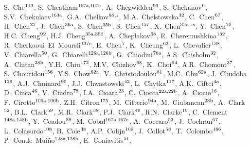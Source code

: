 \begin{flushleft}
S.~Che$^\textrm{\scriptsize 113}$,
S.~Cheatham$^\textrm{\scriptsize 167a,167c}$,
A.~Chegwidden$^\textrm{\scriptsize 93}$,
S.~Chekanov$^\textrm{\scriptsize 6}$,
S.V.~Chekulaev$^\textrm{\scriptsize 163a}$,
G.A.~Chelkov$^\textrm{\scriptsize 68}$$^{,l}$,
M.A.~Chelstowska$^\textrm{\scriptsize 32}$,
C.~Chen$^\textrm{\scriptsize 67}$,
H.~Chen$^\textrm{\scriptsize 27}$,
J.~Chen$^\textrm{\scriptsize 36a}$,
S.~Chen$^\textrm{\scriptsize 35b}$,
S.~Chen$^\textrm{\scriptsize 157}$,
X.~Chen$^\textrm{\scriptsize 35c}$$^{,m}$,
Y.~Chen$^\textrm{\scriptsize 70}$,
H.C.~Cheng$^\textrm{\scriptsize 92}$,
H.J.~Cheng$^\textrm{\scriptsize 35a,35d}$,
A.~Cheplakov$^\textrm{\scriptsize 68}$,
E.~Cheremushkina$^\textrm{\scriptsize 132}$,
R.~Cherkaoui~El~Moursli$^\textrm{\scriptsize 137e}$,
E.~Cheu$^\textrm{\scriptsize 7}$,
K.~Cheung$^\textrm{\scriptsize 63}$,
L.~Chevalier$^\textrm{\scriptsize 138}$,
V.~Chiarella$^\textrm{\scriptsize 50}$,
G.~Chiarelli$^\textrm{\scriptsize 126a,126b}$,
G.~Chiodini$^\textrm{\scriptsize 76a}$,
A.S.~Chisholm$^\textrm{\scriptsize 32}$,
A.~Chitan$^\textrm{\scriptsize 28b}$,
Y.H.~Chiu$^\textrm{\scriptsize 172}$,
M.V.~Chizhov$^\textrm{\scriptsize 68}$,
K.~Choi$^\textrm{\scriptsize 64}$,
A.R.~Chomont$^\textrm{\scriptsize 37}$,
S.~Chouridou$^\textrm{\scriptsize 156}$,
Y.S.~Chow$^\textrm{\scriptsize 62a}$,
V.~Christodoulou$^\textrm{\scriptsize 81}$,
M.C.~Chu$^\textrm{\scriptsize 62a}$,
J.~Chudoba$^\textrm{\scriptsize 129}$,
A.J.~Chuinard$^\textrm{\scriptsize 90}$,
J.J.~Chwastowski$^\textrm{\scriptsize 42}$,
L.~Chytka$^\textrm{\scriptsize 117}$,
A.K.~Ciftci$^\textrm{\scriptsize 4a}$,
D.~Cinca$^\textrm{\scriptsize 46}$,
V.~Cindro$^\textrm{\scriptsize 78}$,
I.A.~Cioara$^\textrm{\scriptsize 23}$,
C.~Ciocca$^\textrm{\scriptsize 22a,22b}$,
A.~Ciocio$^\textrm{\scriptsize 16}$,
F.~Cirotto$^\textrm{\scriptsize 106a,106b}$,
Z.H.~Citron$^\textrm{\scriptsize 175}$,
M.~Citterio$^\textrm{\scriptsize 94a}$,
M.~Ciubancan$^\textrm{\scriptsize 28b}$,
A.~Clark$^\textrm{\scriptsize 52}$,
B.L.~Clark$^\textrm{\scriptsize 59}$,
M.R.~Clark$^\textrm{\scriptsize 38}$,
P.J.~Clark$^\textrm{\scriptsize 49}$,
R.N.~Clarke$^\textrm{\scriptsize 16}$,
C.~Clement$^\textrm{\scriptsize 148a,148b}$,
Y.~Coadou$^\textrm{\scriptsize 88}$,
M.~Cobal$^\textrm{\scriptsize 167a,167c}$,
A.~Coccaro$^\textrm{\scriptsize 52}$,
J.~Cochran$^\textrm{\scriptsize 67}$,
L.~Colasurdo$^\textrm{\scriptsize 108}$,
B.~Cole$^\textrm{\scriptsize 38}$,
A.P.~Colijn$^\textrm{\scriptsize 109}$,
J.~Collot$^\textrm{\scriptsize 58}$,
T.~Colombo$^\textrm{\scriptsize 166}$,
P.~Conde~Mui\~no$^\textrm{\scriptsize 128a,128b}$,
E.~Coniavitis$^\textrm{\scriptsize 51}$,

\end{flushleft}
